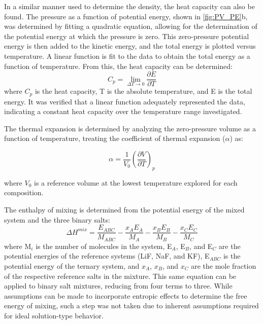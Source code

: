 \documentclass[preprint,12pt]{elsarticle}
\begin{document}
In a similar manner used to determine the density, the heat capacity can also be found. The pressure as a function of potential energy, shown in \cref{fig:PV_PE}b, was determined by fitting a quadratic equation, allowing for the determination of the potential energy at which the pressure is zero. This zero-pressure potential energy is then added to the kinetic energy, and the total energy is plotted versus temperature. A linear function is fit to the data to obtain the total energy as a function of temperature. From this, the heat capacity can be determined:
\begin{equation}\label{eq:cp}
C_p=\lim_{\Delta T\to 0}\frac{\partial{E}}{\partial{T}}
\end{equation}
\noindent where $C_p$ is the heat capacity, T is the absolute temperature, and E is the total energy. It was verified that a linear function adequately represented the data, indicating a constant heat capacity over the temperature range investigated. 

The thermal expansion is determined by analyzing the zero-pressure volume as a function of temperature, treating the coefficient of thermal expansion ($\alpha$) as:

\begin{equation}\label{eq:cte}
\alpha = \frac{1}{V_0} \left(\frac{\partial{V}}{\partial{T}} \right)_p
\end{equation}

\noindent where $V_0$ is a reference volume at the lowest temperature explored for each composition. 

The enthalpy of mixing is determined from the potential energy of the mixed system and the three binary salts:
\begin{equation}
 \label{eq:Hmix}
 \Delta H^{mix} = \frac{E_{ABC}}{M_{ABC}} - \frac{x_A E_A}{M_A} - \frac{x_B E_B}{M_B} - \frac{x_C E_C}{M_C}
\end{equation}
where M$_i$ is the number of molecules in the system, E$_A$, E$_B$, and E$_C$ are the potential energies of the reference systems (LiF, NaF, and KF), E$_{ABC}$ is the potential energy of the ternary system, and $x_A$, $x_B$, and $x_C$ are the mole fraction of the respective reference salts in the mixture. This same equation can be applied to binary salt mixtures, reducing from four terms to three. While assumptions can be made to incorporate entropic effects to determine the free energy of mixing, such a step was not taken due to inherent assumptions required for ideal solution-type behavior. 
\end{document}
